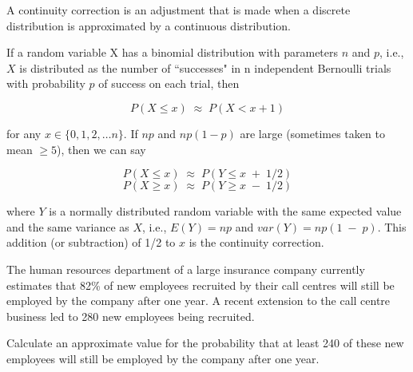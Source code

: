 \documentclass[a4paper,12pt]{article}
\begin{document}
\large

\begin{framed}
\noindent A continuity correction is an adjustment that is made when a discrete distribution is approximated by a continuous distribution.
\\ 
\medskip

\noindent If a random variable X has a binomial distribution with parameters $n$ and $p$, i.e., $X$ is distributed as the number of ``successes" in n independent Bernoulli trials with probability $p$ of success on each trial, then

    \[ {\displaystyle P(X\leq x) \;\approx \; P(X<x+1)} \]

\noindent for any $x \in \{0, 1, 2, \ldots n\}$. If $np$ and $np(1 - p)$ are large (sometimes taken to mean $\geq 5$), then we can say

    \[ {\displaystyle P(X\leq x) \;\approx \; P(Y\leq x \;+\;1/2)} \]
    \[ {\displaystyle P(X\geq x) \;\approx \; P(Y\geq x \;-\;1/2)} \]

\noindent where $Y$ is a normally distributed random variable with the same expected value and the same variance as $X$, i.e., $E(Y) = np$ and $var(Y) = np(1 \;-\; p)$. This addition (or subtraction) of 1/2 to $x$ is the continuity correction.
\end{framed}
\newpage

\noindent The human resources department of a large insurance company currently estimates that 82\% of new employees recruited by their call centres will still be employed by the company after one year. A recent extension to the call centre business led to 280
new employees being recruited.
\medskip 

\noindent Calculate an approximate value for the probability that at least 240 of these new employees will still be employed by the company after one year.
\end{document}
